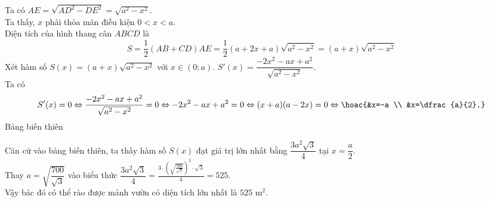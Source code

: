 \begin{ex}
{Ta có $A E=\sqrt{A D^2-D E^2}=\sqrt{a^2-x^2}$. \\
Ta thấy, $x$ phải thỏa mãn điều kiện $0<x<a$. \\
Diện tích của hình thang cân $A B C D$ là
$$
S=\dfrac{1}{2}(A B+C D) A E=\dfrac{1}{2}(a+2 x+a) \sqrt{a^2-x^2}=(a+x) \sqrt{a^2-x^2}
$$
Xét hàm số $S(x)=(a+x) \sqrt{a^2-x^2}$ với $x \in(0 ; a)$. $S'(x)=\dfrac{-2 x^2-a x+a^2}{\sqrt{a^2-x^2}}$. \\
Ta có 
$$S^{\prime}(x)=0 \Leftrightarrow \frac{-2 x^2-a x+a^2}{\sqrt{a^2-x^2}}=0 \Leftrightarrow-2 x^2-a x+a^2=0 \Leftrightarrow(x+a)(a-2 x)=0 \Leftrightarrow\hoac{&x=-a \\ &x=\dfrac{a}{2}.}$$
Bảng biến thiên
\begin{center}
\end{center}
Căn cứ vào bảng biến thiên, ta thấy hàm số $S(x)$ đạt giá trị lớn nhất bằng $\dfrac{3 a^2 \sqrt{3}}{4}$ tại $x=\dfrac{a}{2}$. \\
Thay $a=\sqrt{\dfrac{700}{\sqrt{3}}}$ vào biểu thức $\dfrac{3 a^2 \sqrt{3}}{4}=\tfrac{3 \cdot\left(\sqrt{\frac{700}{\sqrt{3}}}\right)^2 \cdot \sqrt{3}}{4}=525$.\\
Vậy bác đó có thể rào được mảnh vườn có diện tích lớn nhất là $525$ m$^2$.
}
\end{ex}

